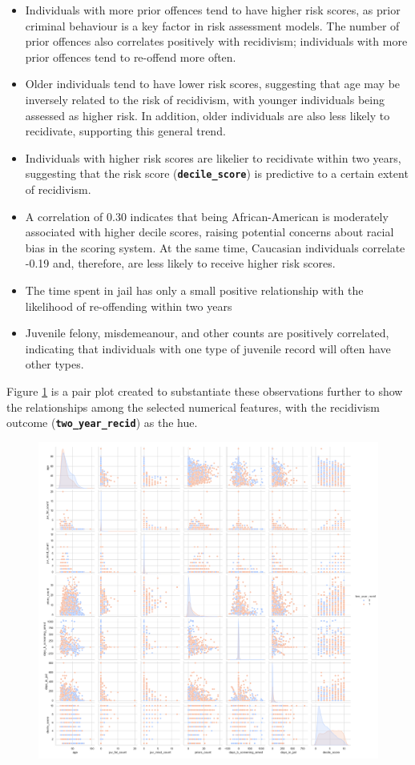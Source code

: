 \begin{itemize}
	\item Individuals with more prior offences tend to have higher risk scores, as prior criminal behaviour is a key factor in risk assessment models. The number of prior offences also correlates positively with recidivism; individuals with more prior offences tend to re-offend more often.
	
	\item Older individuals tend to have lower risk scores, suggesting that age may be inversely related to the risk of recidivism, with younger individuals being assessed as higher risk. In addition, older individuals are also less likely to recidivate, supporting this general trend.
	
	\item Individuals with higher risk scores are likelier to recidivate within two years, suggesting that the risk score (\textbf{\texttt{decile\_score}}) is predictive to a certain extent of recidivism.
	
	\item A correlation of 0.30 indicates that being African-American is moderately associated with higher decile scores, raising potential concerns about racial bias in the scoring system. At the same time, Caucasian individuals correlate -0.19 and, therefore, are less likely to receive higher risk scores.
	
	\item The time spent in jail has only a small positive relationship with the likelihood of re-offending within two years
	
	\item  Juvenile felony, misdemeanour, and other counts are positively correlated, indicating that individuals with one type of juvenile record will often have other types.
\end{itemize}

Figure \ref{fig:pairplot} is a pair plot created to substantiate these observations further to show the relationships among the selected numerical features, with the recidivism outcome (\textbf{\texttt{two\_year\_recid}}) as the hue.

\begin{figure}
	\centering
	\includegraphics[width=0.7\linewidth]{img/pair_plot}
	\caption{}
	\label{fig:pairplot}
\end{figure}


